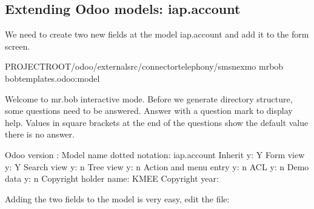 \documentclass[letterpaper,10pt,english]{sphinxmanual}
\begin{document}
\subsection{Extending Odoo models: iap.account}
\label{\detokenize{technical:extending-odoo-models-iap-account}}
We need to create two new fields at the model iap.account and add it to the form screen.

\begin{sphinxVerbatim}[commandchars=\\\{\}]
 PROJECT\PYGZus{}ROOT/odoo/external\PYGZhy{}src/connector\PYGZhy{}telephony/sms\PYGZus{}nexmo
mrbob bobtemplates.odoo:model

Welcome to mr.bob interactive mode. Before we generate directory structure,
some questions need to be answered. Answer with a question mark to display help.
Values in square brackets at the end of the questions show the
default value  there is no answer.

    \PYGZhy{}\PYGZhy{}\PYGZgt{} Odoo version  \PYG{o}{[}\PYG{o}{]}: 
    \PYGZhy{}\PYGZhy{}\PYGZgt{} Model name dotted notation: iap.account
    \PYGZhy{}\PYGZhy{}\PYGZgt{} Inherit \PYG{o}{[}y\PYG{o}{]}: Y
    \PYGZhy{}\PYGZhy{}\PYGZgt{} Form view \PYG{o}{[}y\PYG{o}{]}: Y
    \PYGZhy{}\PYGZhy{}\PYGZgt{} Search view \PYG{o}{[}y\PYG{o}{]}: n
    \PYGZhy{}\PYGZhy{}\PYGZgt{} Tree view \PYG{o}{[}y\PYG{o}{]}: n
    \PYGZhy{}\PYGZhy{}\PYGZgt{} Action and menu entry \PYG{o}{[}y\PYG{o}{]}: n
    \PYGZhy{}\PYGZhy{}\PYGZgt{} ACL \PYG{o}{[}y\PYG{o}{]}: n
    \PYGZhy{}\PYGZhy{}\PYGZgt{} Demo data \PYG{o}{[}y\PYG{o}{]}: n
    \PYGZhy{}\PYGZhy{}\PYGZgt{} Copyright holder name: KMEE
    \PYGZhy{}\PYGZhy{}\PYGZgt{} Copyright year: 
\end{sphinxVerbatim}

Adding the two fields to the model is very easy, edit the file: 

\begin{sphinxVerbatim}[commandchars=\\\{\}]
      

 

      
      
      
\end{sphinxVerbatim}
\end{document}
